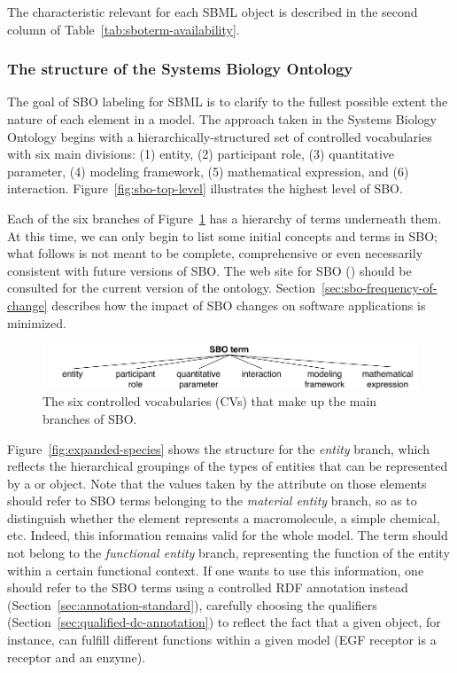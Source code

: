 The characteristic relevant for each SBML object is described in
the second column of Table~\ref{tab:sboterm-availability}.


\subsubsection{The structure of the Systems Biology Ontology}

The goal of SBO labeling for SBML is to clarify to the fullest
possible extent the nature of each element in a model.  The
approach taken in the Systems Biology Ontology begins with a
hierarchically-structured set of controlled vocabularies with six
main divisions: (1) entity, (2) participant role, (3) quantitative
parameter, (4) modeling framework, (5) mathematical expression,
and (6) interaction.  Figure~\vref{fig:sbo-top-level} illustrates
the highest level of SBO.

Each of the six branches of Figure~\ref{fig:sbo-top-level} has a
hierarchy of terms underneath them.  At this time, we can only
begin to list some initial concepts and terms in SBO; what follows
is not meant to be complete, comprehensive or even necessarily
consistent with future versions of SBO.  The web site for SBO
(\sboref) should be consulted for the current version of the
ontology.  Section~\ref{sec:sbo-frequency-of-change} describes how
the impact of SBO changes on software applications is minimized.

\begin{figure}[tbh]
  \centering
  \includegraphics[scale = 0.8]{figs/sbo-top-level}
  \vspace*{1ex}
  \caption{The six controlled vocabularies (CVs) that
      make up the main branches of SBO.}
  \label{fig:sbo-top-level}
\end{figure}

Figure~\vref{fig:expanded-species} shows the structure for the
\emph{entity} branch, which reflects the hierarchical groupings of
the types of entities that can be represented by a \Compartment or
\Species object.  Note that the values taken by the
 attribute on those elements should refer to SBO
terms belonging to the \emph{material entity} branch, so as to
distinguish whether the element represents a macromolecule, a
simple chemical, etc.  Indeed, this information remains valid for
the whole model. The term should not belong to the
\emph{functional entity} branch, representing the function of the
entity within a certain functional context. If one wants to use
this information, one should refer to the SBO terms using a
controlled RDF annotation instead
(Section~\ref{sec:annotation-standard}), carefully choosing the
qualifiers (Section~\ref{sec:qualified-dc-annotation}) to reflect
the fact that a given \Species object, for instance, can fulfill
different functions within a given model (\eg EGF receptor is a
receptor and an enzyme).

